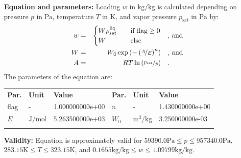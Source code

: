 \textbf{Equation and parameters:}
\newline
%
Loading $w$ in $\si{\kilogram\per\kilogram}$ is calculated depending on pressure $p$ in $\si{\pascal}$, temperature $T$ in $\si{\kelvin}$, and vapor pressure $p_\mathrm{sat}$ in $\si{\pascal}$ by:
%
\begin{equation*}
\begin{split}
w &=& \begin{cases} W \rho_\mathrm{sat}^{\mathrm{liq}} & \quad \text{if flag} \geq 0 \\ W & \quad \text{else} \end{cases} & \quad\text{, and} \\
W &=& W_0 \exp \left( - \left( \nicefrac{A}{E} \right) ^{n} \right) & \quad\text{, and} \\
A &=& R T \ln \left( \nicefrac{p_\mathrm{sat}}{p} \right) & \quad\text{.} \\
\end{split}
\end{equation*}
%
The parameters of the equation are:
%
\begin{longtable}[l]{lll|lll}
\toprule
\addlinespace
\textbf{Par.} & \textbf{Unit} & \textbf{Value} &	\textbf{Par.} & \textbf{Unit} & \textbf{Value} \\
\addlinespace
\midrule
\endhead

\bottomrule
\endfoot
\bottomrule
\endlastfoot
\addlinespace

flag & - & 1.000000000e+00 & $n$ & - & 1.430000000e+00 \\
$E$ & $\si{\joule\per\mole}$ & 5.263500000e+03 & $W_0$ & $\si{\cubic\meter\per\kilogram}$ & 3.250000000e-03 \\

\addlinespace\end{longtable}

\textbf{Validity:}
\newline
Equation is approximately valid for $59390.0 \si{\pascal} \leq p \leq 957340.0 \si{\pascal}$,  $283.15 \si{\kelvin} \leq T \leq 323.15 \si{\kelvin}$, and $0.1655 \si{\kilogram\per\kilogram} \leq w \leq 1.09799 \si{\kilogram\per\kilogram}$.
\newline

